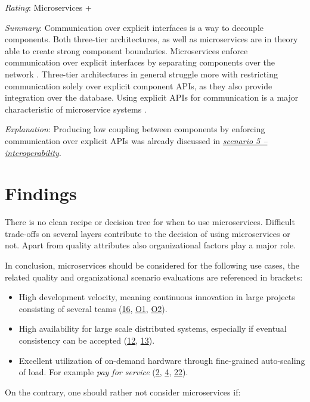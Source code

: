 \textit{Rating}: Microservices +

\textit{Summary}: 
Communication over explicit interfaces is a way to decouple components.
Both three-tier architectures, as well as microservices are in theory able to create strong component boundaries.
Microservices enforce communication over explicit interfaces by separating components over the network \cite{FowlerTradeoffsBoundaries2015}.
Three-tier architectures in general struggle more with restricting communication solely over explicit component \ac{API}s, as they also provide integration over the database.
Using explicit \ac{API}s for communication is a major characteristic of microservice systems \cite{Vogels2006}.

\textit{Explanation}:
Producing low coupling between components by enforcing communication over explicit \ac{API}s was already discussed in \textit{\hyperref[quaMicro:s5]{scenario 5 -- interoperability}}.


\section{Findings}
\label{quaRating:conclusion}
There is no clean recipe or decision tree for when to use microservices.
Difficult trade-offs on several layers contribute to the decision of using microservices or not.
Apart from quality attributes also organizational factors play a major role.

In conclusion, microservices should be considered for the following use cases, the related quality and organizational scenario evaluations are referenced in brackets:

\begin{itemize}
\item High development velocity, meaning continuous innovation in large projects consisting of several teams (\hyperref[quaMicro:s16]{16}, \hyperref[quaMicro:so1]{O1}, \hyperref[quaMicro:so2]{O2}).
\item High availability for large scale distributed systems, especially if eventual consistency can be accepted (\hyperref[quaMicro:s12]{12}, \hyperref[quaMicro:s13]{13}).
\item Excellent utilization of on-demand hardware through fine-grained auto-scaling of load. For example \textit{pay for service} (\hyperref[quaMicro:s2]{2}, \hyperref[quaMicro:s4]{4}, \hyperref[quaMicro:s22]{22}). \end{itemize}

On the contrary, one should rather not consider microservices if:

